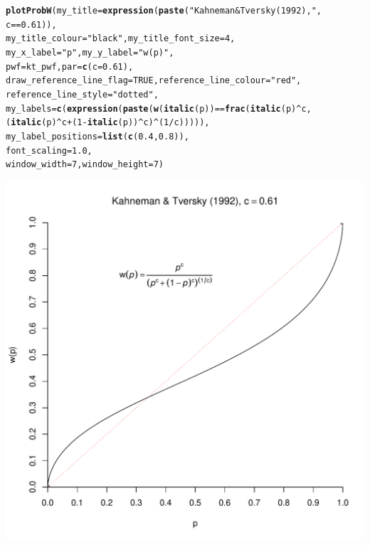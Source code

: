 \documentclass{article}\usepackage[]{graphicx}\usepackage[]{color}
\makeatletter
\def\maxwidth{ %
  \ifdim\Gin@nat@width>\linewidth
    \linewidth
  \else
    \Gin@nat@width
  \fi
}
\newcommand{\hlnum}[1]{\textcolor[rgb]{0.686,0.059,0.569}{#1}}%
\newcommand{\hlstr}[1]{\textcolor[rgb]{0.192,0.494,0.8}{#1}}%
\newcommand{\hlopt}[1]{\textcolor[rgb]{0,0,0}{#1}}%
\newcommand{\hlstd}[1]{\textcolor[rgb]{0.345,0.345,0.345}{#1}}%
\newcommand{\hlkwc}[1]{\textcolor[rgb]{0.333,0.667,0.333}{#1}}%
\newcommand{\hlkwd}[1]{\textcolor[rgb]{0.737,0.353,0.396}{\textbf{#1}}}%
\newenvironment{kframe}{%
 \def\at@end@of@kframe{}%
 \ifinner\ifhmode%
  \def\at@end@of@kframe{\end{minipage}}%
  \begin{minipage}{\columnwidth}%
 \fi\fi%
 \def\FrameCommand##1{\hskip\@totalleftmargin \hskip-\fboxsep
 \colorbox{shadecolor}{##1}\hskip-\fboxsep
     \hskip-\linewidth \hskip-\@totalleftmargin \hskip\columnwidth}%
 \MakeFramed {\advance\hsize-\width
   \@totalleftmargin\z@ \linewidth\hsize
   \@setminipage}}%
 {\par\unskip\endMakeFramed%
 \at@end@of@kframe}
\newenvironment{knitrout}{}{} %
\makeatother
\begin{document}
\begin{knitrout}
\color{fgcolor}\begin{kframe}
\begin{alltt}
\hlkwd{plotProbW}\hlstd{(}\hlkwc{my_title}\hlstd{=}\hlkwd{expression}\hlstd{(}\hlkwd{paste}\hlstd{(}\hlstr{"Kahneman & Tversky (1992), "}\hlstd{,}
        \hlstd{c}\hlopt{==}\hlnum{0.61}\hlstd{)),}
        \hlkwc{my_title_colour}\hlstd{=}\hlstr{"black"}\hlstd{,} \hlkwc{my_title_font_size}\hlstd{=}\hlnum{4}\hlstd{,}
        \hlkwc{my_x_label} \hlstd{=} \hlstr{"p"}\hlstd{,} \hlkwc{my_y_label} \hlstd{=} \hlstr{"w(p)"}\hlstd{,}
        \hlkwc{pwf}\hlstd{=kt_pwf,} \hlkwc{par}\hlstd{=}\hlkwd{c}\hlstd{(}\hlkwc{c}\hlstd{=}\hlnum{0.61}\hlstd{),}
        \hlkwc{draw_reference_line_flag}\hlstd{=}\hlnum{TRUE}\hlstd{,} \hlkwc{reference_line_colour}\hlstd{=}\hlstr{"red"}\hlstd{,}
        \hlkwc{reference_line_style}\hlstd{=}\hlstr{"dotted"}\hlstd{,}
        \hlkwc{my_labels}\hlstd{=}\hlkwd{c}\hlstd{(}\hlkwd{expression}\hlstd{(}\hlkwd{paste}\hlstd{(}\hlkwd{w}\hlstd{(}\hlkwd{italic}\hlstd{(p))} \hlopt{==} \hlkwd{frac}\hlstd{(}\hlkwd{italic}\hlstd{(p)}\hlopt{^}\hlstd{c,}
                \hlstd{(}\hlkwd{italic}\hlstd{(p)}\hlopt{^}\hlstd{c} \hlopt{+} \hlstd{(}\hlnum{1}\hlopt{-}\hlkwd{italic}\hlstd{(p))}\hlopt{^}\hlstd{c)}\hlopt{^}\hlstd{(}\hlnum{1}\hlopt{/}\hlstd{c))))),}
        \hlkwc{my_label_positions}\hlstd{=}\hlkwd{list}\hlstd{(}\hlkwd{c}\hlstd{(}\hlnum{0.4}\hlstd{,}\hlnum{0.8}\hlstd{)),}
        \hlkwc{font_scaling}\hlstd{=}\hlnum{1.0}\hlstd{,}
        \hlkwc{window_width}\hlstd{=}\hlnum{7}\hlstd{,} \hlkwc{window_height}\hlstd{=}\hlnum{7}\hlstd{)}
\end{alltt}
\end{kframe}

{\centering \includegraphics[width=\maxwidth]{figure/unnamed-chunk-20} 

}
\end{knitrout}
\end{document}
